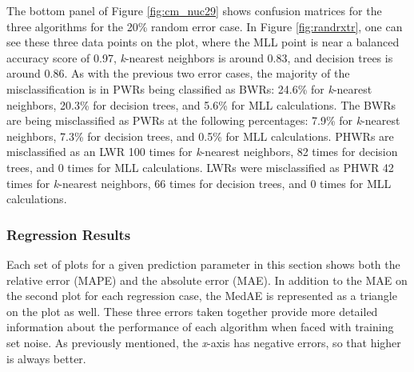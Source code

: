 The bottom panel of Figure \ref{fig:cm_nuc29} shows confusion matrices for the
three algorithms for the 20\% random error case. In Figure \ref{fig:randrxtr},
one can see these three data points on the plot, where the \gls{MLL} point is
near a balanced accuracy score of 0.97, \textit{k}-nearest neighbors is around
0.83, and decision trees is around 0.86. As with the previous two error cases,
the majority of the misclassification is in \gls{PWR}s being classified as
\gls{BWR}s: 24.6\% for \textit{k}-nearest neighbors, 20.3\% for decision trees,
and 5.6\% for \gls{MLL} calculations.  The \gls{BWR}s are being misclassified
as \gls{PWR}s at the following percentages: 7.9\% for \textit{k}-nearest
neighbors, 7.3\% for decision trees, and 0.5\% for \gls{MLL} calculations.
\Gls{PHWR}s are misclassified as an \gls{LWR} 100 times for \textit{k}-nearest
neighbors, 82 times for decision trees, and 0 times for \gls{MLL} calculations.
\Gls{LWR}s were misclassified as \gls{PHWR} 42 times for \textit{k}-nearest
neighbors, 66 times for decision trees, and 0 times for \gls{MLL} calculations.

\subsubsection{Regression Results}
\label{sec:randerrB}

Each set of plots for a given prediction parameter in this section shows both
the relative error (\gls{MAPE}) and the absolute error (\gls{MAE}). In addition
to the \gls{MAE} on the second plot for each regression case, the \gls{MedAE}
is represented as a triangle on the plot as well. These three errors taken
together provide more detailed information about the performance of each
algorithm when faced with training set noise.  As previously mentioned, the
\textit{x}-axis has negative errors, so that higher is always better.  

